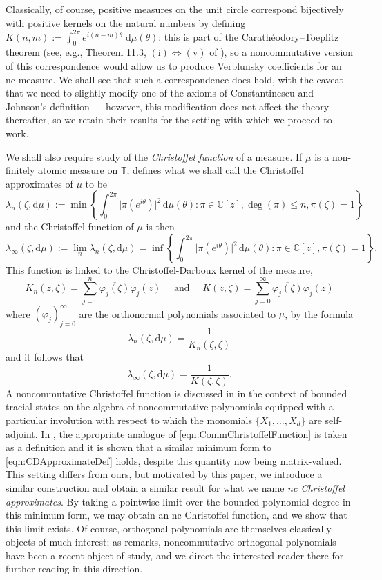 \documentclass[11pt,reqno]{amsart}
\def\p{\varphi}
\def\l{\lambda}
\def\z{\zeta}
\def\th{\theta}
\def\rmd{\mathrm{d}}
\def\CC{\mathbb{C}}
\def\TT{\mathbb{T}}
\theoremstyle{definition}
\numberwithin{equation}{section}
\begin{document}
Classically, of course, positive measures on the unit circle correspond bijectively with positive kernels on the natural numbers by defining \(K(n,m) := \int_0^{2\pi} e^{i(n-m)\th} \; \rmd \mu(\th)\): this is part of the Carath\'{e}odory--Toeplitz theorem (see, e.g., Theorem 11.3, \(\mathrm{(i)} \iff \mathrm{(v)}\) of \cite{Sch17}), so a noncommutative version of this correspondence would allow us to produce Verblunsky coefficients for an nc measure. We shall see that such a correspondence does hold, with the caveat that we need to slightly modify one of the axioms of Constantinescu and Johnson's definition --- however, this modification does not affect the theory thereafter, so we retain their results for the setting with which we proceed to work. 

We shall also require study of the \emph{Christoffel function} of a measure. If \(\mu\) is a non-finitely atomic measure on \(\TT\), \cite{Sim05} defines what we shall call the Christoffel approximates of \(\mu\) to be
\begin{equation}
    \label{eqn:CDApproximateDef}
    \l_{n}(\z, \rmd \mu) := \min\left\{\int_0^{2\pi} \lvert \pi(e^{i\th}) \rvert^2 \, \rmd \mu(\th) : \pi \in \CC[z], \deg(\pi) \leq n, \pi(\z) = 1 \right\}
\end{equation}
and the Christoffel function of \(\mu\) is then
\[
    \l_\infty (\z, \rmd\mu) := \lim_n \l_n(\z, \rmd\mu) = \inf\left\{\int_0^{2\pi} \lvert \pi(e^{i\th}) \rvert^2 \, \rmd \mu(\th) : \pi \in \CC[z], \pi(\z) = 1 \right\}.
\]
This function is linked to the Christoffel-Darboux kernel of the measure,
\[
    K_n(z,\z) = \sum_{j=0}^{n} \overline{\p_j(\z)}\p_j(z) \quad \text{ and } \quad K(z,\z) = \sum_{j=0}^{\infty} \overline{\p_j(\z)}\p_j(z)
\]
where \((\p_j)_{j=0}^{\infty}\) are the orthonormal polynomials associated to \(\mu\), by the formula
\begin{equation}
    \label{eqn:CommChristoffelFunction}
    \l_n(\z, \rmd\mu) = \frac{1}{K_n(\z,\z)}
\end{equation}
and it follows that
\[
    \l_\infty(\z, \rmd\mu) = \frac{1}{K(\z,\z)}.
\]
A noncommutative Christoffel function is discussed in \cite{BMV23} in the context of bounded tracial states on the algebra of noncommutative polynomials equipped with a particular involution with respect to which the monomials \(\{X_1, \ldots, X_d\}\) are self-adjoint. In \cite{BMV23}, the appropriate analogue of \eqref{eqn:CommChristoffelFunction} is taken as a definition and it is shown that a similar minimum form to \eqref{eqn:CDApproximateDef} holds, despite this quantity now being matrix-valued. This setting differs from ours, but motivated by this paper, we introduce a similar construction and obtain a similar result for what we name \emph{nc Christoffel approximates}. By taking a pointwise limit over the bounded polynomial degree in this minimum form, we may obtain an nc Christoffel function, and we show that this limit exists. Of course, orthogonal polynomials are themselves classically objects of much interest; as \cite{BMV23} remarks, noncommutative orthogonal polynomials have been a recent object of study, and we direct the interested reader there for further reading in this direction.
\end{document}
